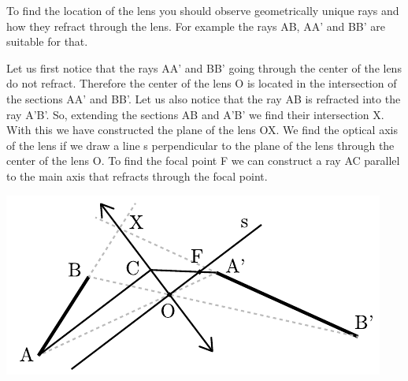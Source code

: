 \hinteng
To find the location of the lens you should observe geometrically unique rays and how they refract through the lens. For example the rays AB, AA’ and BB’ are suitable for that.

\solueng
Let us first notice that the rays AA’ and BB’ going through the center of the lens do not refract. Therefore the center of the lens O is located in the intersection of the sections AA’ and BB’. Let us also notice that the ray AB is refracted into the ray A’B’. So, extending the sections AB and A’B’ we find their intersection X. With this we have constructed the plane of the lens OX. We find the optical axis of the lens if we draw a line s perpendicular to the plane of the lens through the center of the lens O. To find the focal point F we can construct a ray AC parallel to the main axis that refracts through the focal point. 
\begin{center}
\includegraphics[width=\textwidth]{2015-lahg-05-laatsLahendus}
\end{center}
\probend